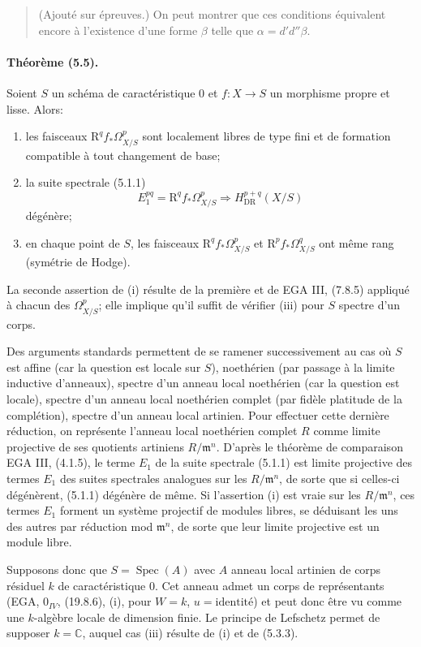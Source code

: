 \documentclass[10pt]{article}
\newcommand{\R}{\mathrm R}
\providecommand{\C}{\mathbb C}
\providecommand{\Spec}{\operatorname{Spec}}
\providecommand{\DR}{\operatorname{DR}}
\begin{document}
\begin{quote}\footnotesize
(Ajouté sur épreuves.) On peut montrer que ces conditions équivalent encore à l'existence d'une forme $\beta$ telle que $\alpha=d'd''\beta$.
\end{quote}

\paragraph{Théorème (5.5).} Soient $S$ un schéma de caractéristique $0$ et $f:X\to S$ un morphisme propre et lisse. Alors:
\begin{enumerate}[label=(\roman*)]
\item les faisceaux $\R^qf_*\Omega_{X/S}^p$ sont localement libres de type fini et de formation compatible à tout changement de base;
\item la suite spectrale (5.1.1)
\[
E_1^{pq}=\R^qf_*\Omega_{X/S}^p\Longrightarrow H_{\DR}^{p+q}(X/S)
\]
dégénère;
\item en chaque point de $S$, les faisceaux $\R^qf_*\Omega_{X/S}^p$ et $\R^pf_*\Omega_{X/S}^q$ ont même rang (symétrie de Hodge).
\end{enumerate}
La seconde assertion de (i) résulte de la première et de EGA III, (7.8.5) appliqué à chacun des $\Omega_{X/S}^p$; elle implique qu'il suffit de vérifier (iii) pour $S$ spectre d'un corps.

Des arguments standards permettent de se ramener successivement au cas où $S$ est affine (car la question est locale sur $S$), noethérien (par passage à la limite inductive d'anneaux), spectre d'un anneau local noethérien (car la question est locale), spectre d'un anneau local noethérien complet (par fidèle platitude de la complétion), spectre d'un anneau local artinien. Pour effectuer cette dernière réduction, on représente l'anneau local noethérien complet $R$ comme limite projective de ses quotients artiniens $R/\mathfrak m^n$. D'après le théorème de comparaison EGA III, (4.1.5), le terme $E_1$ de la suite spectrale (5.1.1) est limite projective des termes $E_1$ des suites spectrales analogues sur les $R/\mathfrak m^n$, de sorte que si celles-ci dégénèrent, (5.1.1) dégénère de même. Si l'assertion (i) est vraie sur les $R/\mathfrak m^n$, ces termes $E_1$ forment un système projectif de modules libres, se déduisant les uns des autres par réduction mod $\mathfrak m^n$, de sorte que leur limite projective est un module libre.

Supposons donc que $S=\Spec(A)$ avec $A$ anneau local artinien de corps résiduel $k$ de caractéristique $0$. Cet anneau admet un corps de représentants (EGA, $0_{IV}$, (19.8.6), (i), pour $W=k$, $u=\mathrm{identité}$) et peut donc être vu comme une $k$-algèbre locale de dimension finie. Le principe de Lefschetz permet de supposer $k=\C$, auquel cas (iii) résulte de (i) et de (5.3.3).
\end{document}
